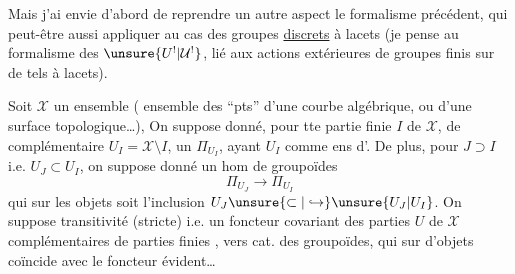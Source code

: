 Mais j'ai envie d'abord de reprendre
 un autre aspect  le formalisme
précédent, qui  peut-être aussi appliquer au cas des groupes \uline{discrets}
à lacets (je pense au formalisme
des $\unsure{U^!|\mathcal{U}^!}$, lié aux actions extérieures de
groupes finis sur de tels  à lacets).

Soit $\mathcal{X}$ un ensemble \inserted{$\ne\varnothing$}
( ensemble des
``pts'' d'une  courbe algébrique,
ou d'une surface topologique\ldots), 
 On suppose
donné, pour tte partie finie $I$ de $\mathcal{X}$,
de complémentaire $U_I=\mathcal{X}\setminus I$, un
 $\Pi_{U_I}$, ayant $U_I$ comme ens
d'. De plus, pour $J\supset I$ i.e.
$U_J\subset U_I$, on suppose donné un hom
de groupoïdes
\[
\Pi_{U_J}\to\Pi_{U_I}
\]
qui sur les objets soit l'inclusion $U_J\unsure{\subset|\hookrightarrow}\unsure{U_J|U_I}$.
On suppose transitivité (stricte) i.e. 
un foncteur covariant  des parties $U$ de
$\mathcal{X}$ complémentaires de parties finies , vers
 cat. des groupoïdes, qui sur 
d'objets coïncide avec le foncteur évident\ldots


